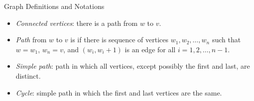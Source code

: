 \documentclass[14pt,aspectratio=1610]{beamer}
\begin{document}
\begin{frame}{Graph Definitions and Notations}
\begin{itemize}
  \item
    \emph{Connected vertices}: there is a path from \(w\) to \(v\).
  \item
    \emph{Path} from \(w\) to \(v\) is if there is sequence of vertices \(w_1, w_2, \ldots, w_n\) such that \(w = w_1\), \(w_n = v\), and \((w_i, w_i + 1)\) is an edge for all \(i = 1, 2, \ldots, n - 1\).
  \item
    \emph{Simple path}: path in which all vertices, except possibly the first and last, are distinct.
  \item
    \emph{Cycle}: simple path in which the first and last vertices are the same.
\end{itemize}
\end{frame}
\end{document}
